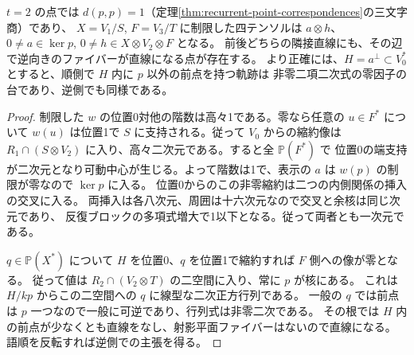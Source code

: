 \begin{proposition}\label{prop:two-sided-center-self-block}
$t=2$ の点では $d(p,p)=1$（定理\ref{thm:recurrent-point-correspondences}の三文字商）であり、
$X=V_1/S$, $F=V_3/T$ に制限した四テンソルは $a\otimes h$、
$0\ne a\in\ker p$, $0\ne h\in X\otimes V_2\otimes F$ となる。
前後どちらの隣接直線にも、その辺で逆向きのファイバーが直線になる点が存在する。
より正確には、$H=a^\perp\subset V_0^*$ とすると、順側で $H$ 内に $p$ 以外の前点を持つ軌跡は
非零二項二次式の零因子の台であり、逆側でも同様である。
\end{proposition}
\begin{proof}
制限した $w$ の位置0対他の階数は高々1である。零なら任意の $u\in F^*$ について
$w(u)$ は位置1で $S$ に支持される。従って $V_0$ からの縮約像は
$R_1\cap(S\otimes V_2)$ に入り、高々二次元である。すると全 $\mathbb P(F^*)$ で
位置0の端支持が二次元となり可動中心が生じる。よって階数は1で、表示の $a$ は $w(p)$ の制限が零なので $\ker p$ に入る。
位置0からのこの非零縮約は二つの内側関係の挿入の交叉に入る。
両挿入は各八次元、周囲は十六次元なので交叉と余核は同じ次元であり、
反復ブロックの多項式増大で1以下となる。従って両者とも一次元である。

$q\in\mathbb P(X^*)$ について $H$ を位置0、$q$ を位置1で縮約すれば $F$ 側への像が零となる。
従って値は $R_2\cap(V_2\otimes T)$ の二空間に入り、常に $p$ が核にある。
これは $H/kp$ からこの二空間への $q$ に線型な二次正方行列である。
一般の $q$ では前点は $p$ 一つなので一般に可逆であり、行列式は非零二次である。
その根では $H$ 内の前点が少なくとも直線をなし、射影平面ファイバーはないので直線になる。
語順を反転すれば逆側での主張を得る。
\end{proof}
